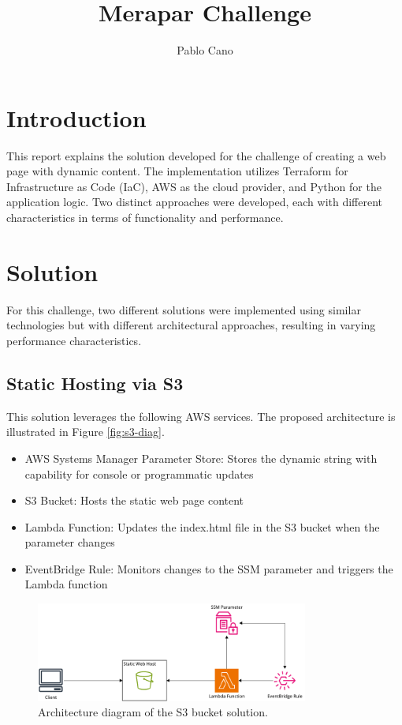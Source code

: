 \documentclass{article}
\title{Merapar Challenge}
\author{Pablo Cano}
\begin{document}
\maketitle

\section{Introduction}

This report explains the solution developed for the challenge of creating a web page with dynamic content. The implementation utilizes Terraform for Infrastructure as Code (IaC), AWS as the cloud provider, and Python for the application logic. Two distinct approaches were developed, each with different characteristics in terms of functionality and performance.

\section{Solution}

For this challenge, two different solutions were implemented using similar technologies but with different architectural approaches, resulting in varying performance characteristics.

\subsection{Static Hosting via S3}

This solution leverages the following AWS services. The proposed architecture is illustrated in Figure \autoref{fig:s3-diag}.

\begin{itemize}
    \item AWS Systems Manager Parameter Store: Stores the dynamic string with capability for console or programmatic updates
    \item S3 Bucket: Hosts the static web page content
    \item Lambda Function: Updates the index.html file in the S3 bucket when the parameter changes
    \item EventBridge Rule: Monitors changes to the SSM parameter and triggers the Lambda function
\end{itemize}

\begin{figure}[h]
\centering
\includegraphics[width=0.8\textwidth]{s3-solution.png}
\caption{Architecture diagram of the S3 bucket solution.}
\label{fig:s3-diag}
\end{figure}
\end{document}
